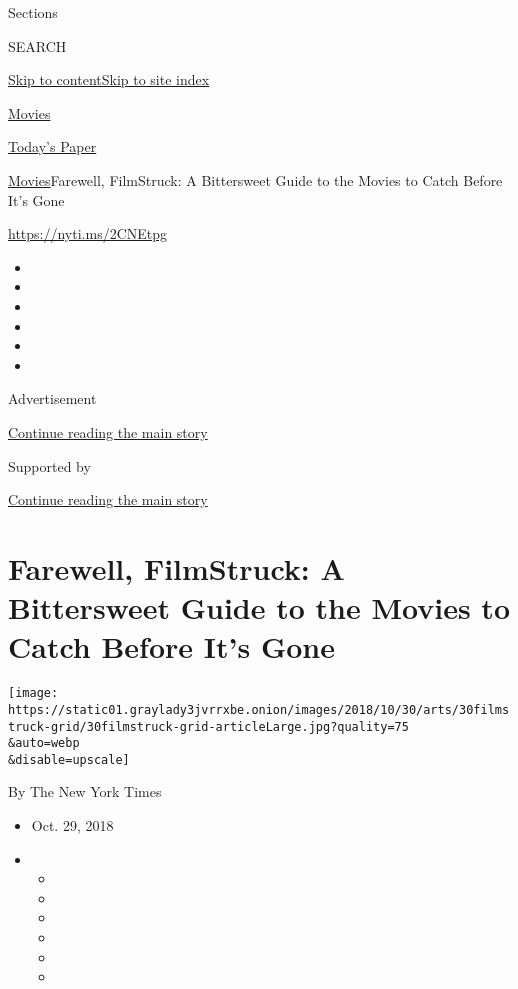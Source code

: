 Sections

SEARCH

\protect\hyperlink{site-content}{Skip to
content}\protect\hyperlink{site-index}{Skip to site index}

\href{https://www.nytimes3xbfgragh.onion/section/movies}{Movies}

\href{https://myaccount.nytimes3xbfgragh.onion/auth/login?response_type=cookie\&client_id=vi}{}

\href{https://www.nytimes3xbfgragh.onion/section/todayspaper}{Today's
Paper}

\href{/section/movies}{Movies}\textbar{}Farewell, FilmStruck: A
Bittersweet Guide to the Movies to Catch Before It's Gone

\url{https://nyti.ms/2CNEtpg}

\begin{itemize}
\item
\item
\item
\item
\item
\item
\end{itemize}

Advertisement

\protect\hyperlink{after-top}{Continue reading the main story}

Supported by

\protect\hyperlink{after-sponsor}{Continue reading the main story}

\hypertarget{farewell-filmstruck-a-bittersweet-guide-to-the-movies-to-catch-before-its-gone}{%
\section{Farewell, FilmStruck: A Bittersweet Guide to the Movies to
Catch Before It's
Gone}\label{farewell-filmstruck-a-bittersweet-guide-to-the-movies-to-catch-before-its-gone}}

\texttt{[image: https://static01.graylady3jvrrxbe.onion/images/2018/10/30/arts/30filmstruck-grid/30filmstruck-grid-articleLarge.jpg?quality=75\\\&auto=webp\\\&disable=upscale]}

By The New York Times

\begin{itemize}
\item
  Oct. 29, 2018
\item
  \begin{itemize}
  \item
  \item
  \item
  \item
  \item
  \item
  \end{itemize}
\end{itemize}

